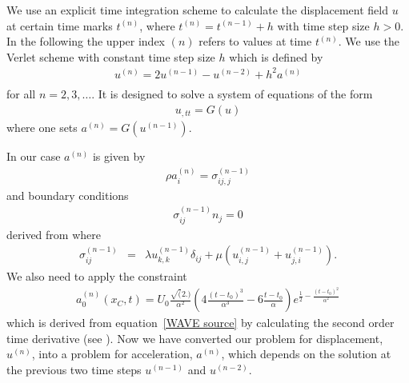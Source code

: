We use an explicit time integration scheme to calculate the displacement field
$u$ at certain time marks $t^{(n)}$, where $t^{(n)}=t^{(n-1)}+h$ with time
step size $h>0$.
In the following the upper index ${(n)}$ refers to values at time $t^{(n)}$.
We use the Verlet scheme with constant time step size $h$
which is defined by
\begin{eqnarray} \label{WAVE dyn 2}
u^{(n)}=2u^{(n-1)}-u^{(n-2)} + h^2 a^{(n)} \\
\end{eqnarray}
for all $n=2,3,\ldots$. It is designed to solve a system of equations of the form
\begin{eqnarray} \label{WAVE dyn 2b} 
u_{,tt}=G(u)
\end{eqnarray}
where one sets $a^{(n)}=G(u^{(n-1)})$.

In our case $a^{(n)}$ is given by
\begin{eqnarray}\label{WAVE dyn 3}
\rho a^{(n)}_{i}=\sigma^{(n-1)}_{ij,j}
\end{eqnarray}
and boundary conditions
\begin{eqnarray} \label{WAVE natural at n}
\sigma^{(n-1)}_{ij}n_{j}=0
\end{eqnarray}
derived from  where 
\begin{eqnarray} \label{WAVE dyn 3a}
\sigma_{ij}^{(n-1)} & = & \lambda u^{(n-1)}_{k,k} \delta_{ij} + \mu ( u^{(n-1)}_{i,j} + u^{(n-1)}_{j,i}).
\end{eqnarray}
We also need to apply the constraint 
\begin{eqnarray} \label{WAVE dyn 3aa}
a^{(n)}_{0}(x_C,t)= U_{0} 
\frac{\sqrt(2.)}{\alpha^2} (4\frac{(t-t_{0})^3}{\alpha^3}-6\frac{t-t_{0}}{\alpha})e^{\frac{1}{2}-\frac{(t-t_{0})^2}{\alpha^2}}
\end{eqnarray}
which is derived from equation~\ref{WAVE source} by calculating the second
order time derivative (see ).
Now we have converted our problem for displacement, $u^{(n)}$, into a problem
for acceleration, $a^{(n)}$, which depends on the solution at the previous two
time steps $u^{(n-1)}$ and $u^{(n-2)}$.

